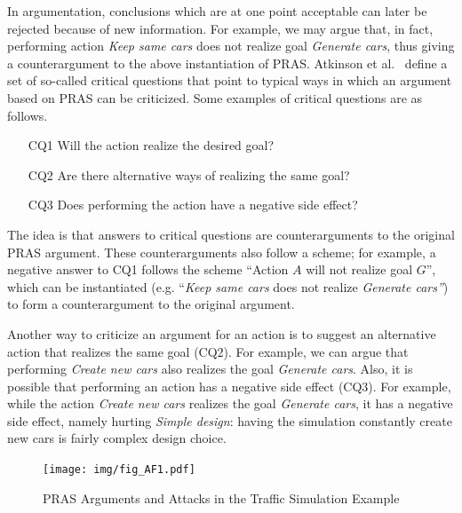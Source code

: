 In argumentation, conclusions which are at one point acceptable can later be rejected because of new information. For example, we may argue that, in fact, performing action \emph{Keep same cars} does not realize goal \emph{Generate cars}, thus giving a counterargument to the above instantiation of PRAS. Atkinson et al.~\cite{atkinson2007} define a set of so-called critical questions that point to typical ways in which an argument based on PRAS can be criticized. Some examples of critical questions are as follows.

\begin{enumerate}
\item[CQ1] Will the action realize the desired goal?
\item[CQ2] Are there alternative ways of realizing the same goal?
\item[CQ3] Does performing the action have a negative side effect?
\end{enumerate}

The idea is that answers to critical questions are counterarguments to the original PRAS argument. These counterarguments also follow a scheme; for example, a negative answer to CQ1 follows the scheme ``Action $A$ will not realize goal $G$'', which can be instantiated (e.g. ``\emph{Keep same cars} does not realize \emph{Generate cars''}) to form a counterargument to the original argument. 

Another way to criticize an argument for an action is to suggest an alternative action that realizes the same goal (CQ2). For example, we can argue that performing \emph{Create new cars} also realizes the goal \emph{Generate cars}. Also, it is possible that performing an action has a negative side effect (CQ3). For example, while the action \emph{Create new cars} realizes the goal \emph{Generate cars}, it has a negative side effect, namely hurting \emph{Simple design}: having the simulation constantly create new cars is fairly complex design choice. 

\begin{figure}[t]
\centering
\texttt{[image: img/fig\_AF1.pdf]}
\caption{PRAS Arguments and Attacks in the Traffic Simulation Example}
\label{fig:pras:example}
\end{figure}

